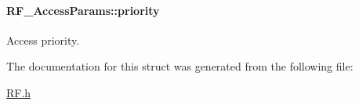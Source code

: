 \paragraph[{priority}]{ R\+F\+\_\+\+Access\+Params\+::priority}\label{struct_r_f___access_params_a9ed4a1af207a7f63beb8cfebdd940894}


Access priority. 



The documentation for this struct was generated from the following file\+:\begin{DoxyCompactItemize}
\item 
\hyperlink{_r_f_8h}{R\+F.\+h}\end{DoxyCompactItemize}
